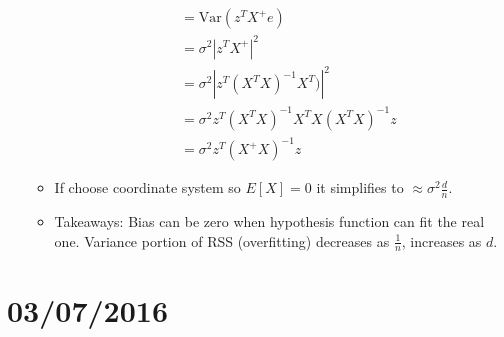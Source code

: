 \documentclass[10pt]{article}
\begin{document}
\begin{itemize}
\begin{itemize}
\begin{align*}
							&= \text{Var}(z^{T}X^{+}e)\\
							&= \sigma^{2} |z^{T}X^{+}|^{2}\\
							&= \sigma^{2} |z^{T}(X^{T}X)^{-1}X^{T})|^{2}\\
							&= \sigma^{2} z^{T}(X^{T}X)^{-1}X^{T}X(X^{T}X)^{-1}z\\
							&= \sigma^{2}z^{T}(X^{+}X)^{-1}z
						\end{align*}
					\item If choose coordinate system so $E[X] = 0$ it simplifies to $\approx \sigma^{2}\frac{d}{n}$.
					\item Takeaways: Bias can be zero when hypothesis function can fit the real one. Variance portion of RSS (overfitting) decreases as $\frac{1}{n}$, increases as $d$.
				\end{itemize}
	\end{itemize}

\newpage
\section*{03/07/2016}
\end{document}
